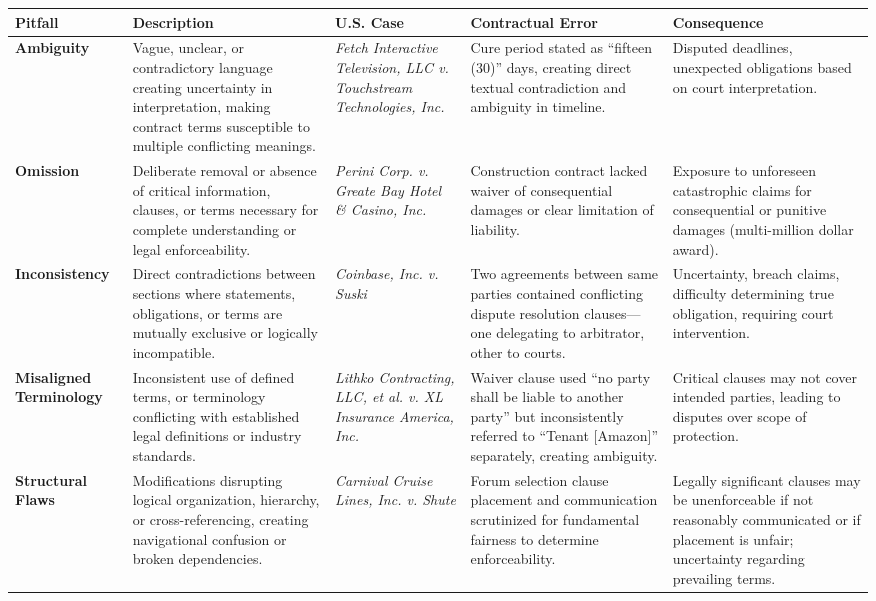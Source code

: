 \documentclass[11pt]{article}
\begin{document}
\begin{table}[h!]
\centering
\small
\renewcommand{\arraystretch}{2.0}
\setlength{\tabcolsep}{3pt}
\begin{tabular}{|>{\centering\arraybackslash}m{1.8cm}|>{\centering\arraybackslash}m{3.8cm}|>{\centering\arraybackslash}m{2.8cm}|>{\centering\arraybackslash}m{3.5cm}|>{\centering\arraybackslash}m{3cm}|}
\hline
\textbf{Pitfall} & \textbf{Description} & \textbf{U.S. Case} & \textbf{Contractual Error} & \textbf{Consequence} \\
\hline
\rowcolor{lightestgray}
\textbf{Ambiguity} & Vague, unclear, or contradictory language creating uncertainty in interpretation, making contract terms susceptible to multiple conflicting meanings. & \textit{Fetch Interactive Television, LLC v. Touchstream Technologies, Inc.} & Cure period stated as ``fifteen (30)'' days, creating direct textual contradiction and ambiguity in timeline. & Disputed deadlines, unexpected obligations based on court interpretation. \\
\hline
\textbf{Omission} & Deliberate removal or absence of critical information, clauses, or terms necessary for complete understanding or legal enforceability. & \textit{Perini Corp. v. Greate Bay Hotel \& Casino, Inc.} & Construction contract lacked waiver of consequential damages or clear limitation of liability. & Exposure to unforeseen catastrophic claims for consequential or punitive damages (multi-million dollar award). \\
\hline
\rowcolor{lightestgray}
\textbf{Inconsistency} & Direct contradictions between sections where statements, obligations, or terms are mutually exclusive or logically incompatible. & \textit{Coinbase, Inc. v. Suski} & Two agreements between same parties contained conflicting dispute resolution clauses---one delegating to arbitrator, other to courts. & Uncertainty, breach claims, difficulty determining true obligation, requiring court intervention. \\
\hline
\textbf{Misaligned Terminology} & Inconsistent use of defined terms, or terminology conflicting with established legal definitions or industry standards. & \textit{Lithko Contracting, LLC, et al. v. XL Insurance America, Inc.} & Waiver clause used ``no party shall be liable to another party'' but inconsistently referred to ``Tenant [Amazon]'' separately, creating ambiguity. & Critical clauses may not cover intended parties, leading to disputes over scope of protection. \\
\hline
\rowcolor{lightestgray}
\textbf{Structural Flaws} & Modifications disrupting logical organization, hierarchy, or cross-referencing, creating navigational confusion or broken dependencies. & \textit{Carnival Cruise Lines, Inc. v. Shute} & Forum selection clause placement and communication scrutinized for fundamental fairness to determine enforceability. & Legally significant clauses may be unenforceable if not reasonably communicated or if placement is unfair; uncertainty regarding prevailing terms. \\

\end{tabular}
\end{table}
\end{document}
